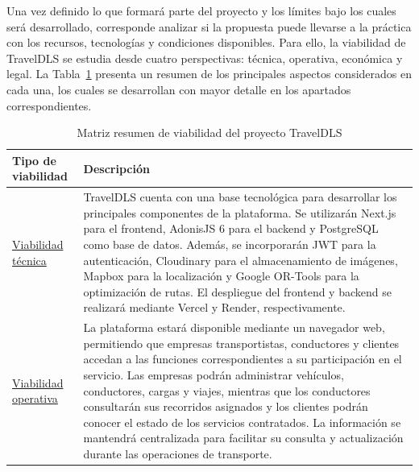 Una vez definido lo que formará parte del proyecto y los límites bajo los cuales será desarrollado, corresponde analizar si la propuesta puede llevarse a la práctica
con los recursos, tecnologías y condiciones disponibles. Para ello, la viabilidad de TravelDLS se estudia desde cuatro perspectivas: técnica, operativa, económica y legal.
La Tabla~\ref{tab:matriz-viabilidad} presenta un resumen de los principales aspectos considerados en cada una, los cuales se desarrollan con mayor detalle en los apartados correspondientes.


\begin{table}[H]
	\centering
	\caption{Matriz resumen de viabilidad del proyecto TravelDLS}
	\label{tab:matriz-viabilidad}
	
	\small
	\renewcommand{\arraystretch}{1.4}
	
	\begin{tabularx}{\textwidth}{
			>{\RaggedRight\arraybackslash}p{3cm}
			>{\RaggedRight\arraybackslash}X
		}
		\toprule
		\textbf{Tipo de viabilidad} & \textbf{Descripción} \\
		\midrule
		
		\hyperref[sec:viabilidad-tecnica]{Viabilidad técnica} &
		TravelDLS cuenta con una base tecnológica para
		desarrollar los principales componentes de la plataforma.
		Se utilizarán Next.js para el frontend, AdonisJS 6 para
		el backend y PostgreSQL como base de datos. Además,
		se incorporarán JWT para la autenticación, Cloudinary
		para el almacenamiento de imágenes, Mapbox para
		la localización y Google OR-Tools para la optimización
		de rutas. El despliegue del frontend y backend se
		realizará mediante Vercel y Render, respectivamente. \\
		
		\midrule
		
		\hyperref[sec:viabilidad-operativa]{Viabilidad operativa} &
		La plataforma estará disponible mediante un navegador
		web, permitiendo que empresas transportistas, conductores
		y clientes accedan a las funciones correspondientes
		a su participación en el servicio. Las empresas podrán
		administrar vehículos, conductores, cargas y viajes,
		mientras que los conductores consultarán sus recorridos
		asignados y los clientes podrán conocer el estado de
		los servicios contratados. La información se mantendrá
		centralizada para facilitar su consulta y actualización
		durante las operaciones de transporte. \\
		
		\midrule
		

\end{tabularx}
\end{table}
